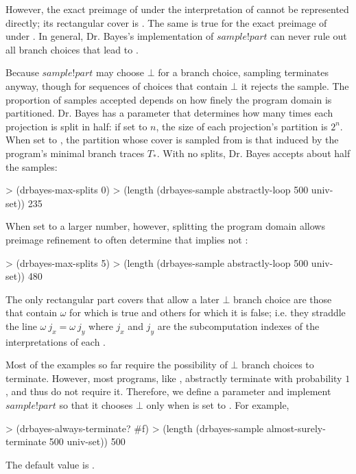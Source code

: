 However, the exact preimage of  under the interpretation of  cannot be represented directly; its rectangular cover is .
The same is true for the exact preimage of  under .
In general, Dr. Bayes's implementation of $sample!part$ can never rule out all branch choices that lead to .

Because $sample!part$ may choose $\bot$ for a branch choice, sampling terminates anyway, though for sequences of choices that contain $\bot$ it rejects the sample.
The proportion of samples accepted depends on how finely the program domain is partitioned.
Dr. Bayes has a parameter  that determines how many times each projection is split in half: if set to $n$, the size of each projection's partition is $2^n$.
When set to , the partition whose cover is sampled from is that induced by the program's minimal branch traces $T_*$.
With no splits, Dr. Bayes accepts about half the samples:
\begin{center}\singlespacing
\begin{schemedisplay}
> (drbayes-max-splits 0)
> (length (drbayes-sample abstractly-loop 500 univ-set))
235
\end{schemedisplay}
\end{center}
When set to a larger number, however, splitting the program domain allows preimage refinement to often determine that  implies not :
\begin{center}\singlespacing
\begin{schemedisplay}
> (drbayes-max-splits 5)
> (length (drbayes-sample abstractly-loop 500 univ-set))
480
\end{schemedisplay}
\end{center}
The only rectangular part covers that allow a later $\bot$ branch choice are those that contain $\omega$ for which  is true and others for which it is false; i.e. they straddle the line $\omega~j_x = \omega~j_y$ where $j_x$ and $j_y$ are the subcomputation indexes of the interpretations of each .

Most of the examples so far require the possibility of $\bot$ branch choices to terminate.
However, most programs, like , abstractly terminate with probability $1$, and thus do not require it.
Therefore, we define a parameter  and implement $sample!part$ so that it chooses $\bot$ only when  is set to .
For example,
\begin{center}\singlespacing
\begin{schemedisplay}
> (drbayes-always-terminate? #f)
> (length (drbayes-sample almost-surely-terminate 500 univ-set))
500
\end{schemedisplay}
\end{center}
The default value is .

